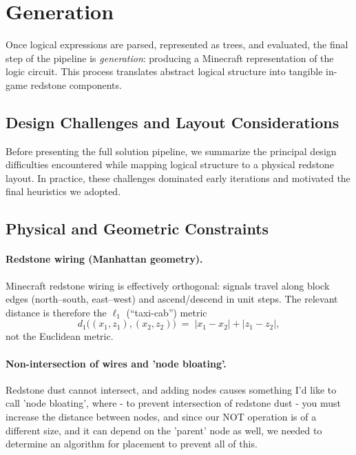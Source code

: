 \documentclass[11pt]{diazessay} %
\begin{document}
\section{Generation}

Once logical expressions are parsed, represented as trees, and evaluated,
the final step of the pipeline is \textit{generation}: producing a Minecraft
representation of the logic circuit. This process translates abstract
logical structure into tangible in-game redstone components.

\subsection{Design Challenges and Layout Considerations}

Before presenting the full solution pipeline, we summarize the principal design
difficulties encountered while mapping logical structure to a physical redstone
layout. In practice, these challenges dominated early iterations and motivated
the final heuristics we adopted.

\subsection{Physical and Geometric Constraints}

\paragraph{Redstone wiring (Manhattan geometry).}
Minecraft redstone wiring is effectively orthogonal: signals travel along block
edges (north--south, east--west) and ascend/descend in unit steps. The relevant
distance is therefore the $\ell_1$ (``taxi-cab'') metric
\[
d_1\big((x_1,z_1),(x_2,z_2)\big) \;=\; |x_1-x_2| + |z_1-z_2|,
\]
not the Euclidean metric.

\paragraph{Non-intersection of wires and 'node bloating'.}
Redstone dust cannot intersect, and adding nodes causes something I'd like to call 'node bloating', where - to prevent intersection of redstone dust - you must increase the distance between nodes, and since our NOT operation is of a different size, and it can depend on the 'parent' node as well, we needed to determine an algorithm for placement to prevent all of this.
\end{document}
